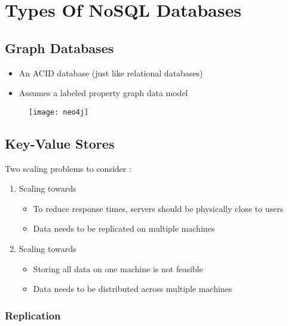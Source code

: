 \section{Types Of NoSQL Databases}

\subsection{Graph Databases}


\begin{itemize}
    \item An ACID database (just like relational databases)
    \item Assumes a labeled property graph data model
\end{itemize}

\begin{figure}[H]
    \centering
    \texttt{[image: neo4j]}
\end{figure}

\subsection{Key-Value Stores}

Two scaling problems to consider :
\begin{enumerate}
    \item Scaling towards 
    \begin{itemize}
        \item To reduce response times, servers should be physically close to users
        \item Data needs to be replicated on multiple machines
    \end{itemize}
    \item Scaling towards 
    \begin{itemize}
        \item Storing all data on one machine is not feasible
        \item Data needs to be distributed across multiple machines
    \end{itemize}
\end{enumerate}

\subsubsection{Replication}

